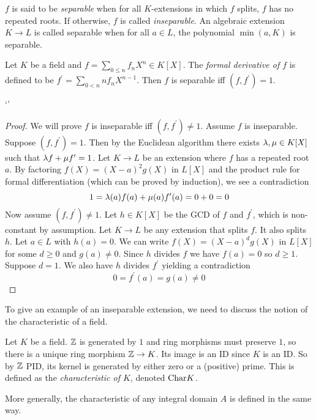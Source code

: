\documentclass{article}
\begin{document}
\begin{dfn} 

  $f$ is said to be \emph{separable} when 
  for all $K$-extensions in which $f$ splits, $f$ has no repeated roots. 
  If otherwise, $f$ is called \emph{inseparable}. 
  An algebraic extension $K \to L$ is called 
  separable when for all $a \in L$,
  the polynomial $\min(a , K)$ is separable.
\end{dfn}

\begin{prop}
  
  Let $K$ be a field and $f = \sum_{0 \leq n} f_n X^n \in K[X]$. 
  The \emph{formal derivative of $f$} is defined to be 
  $f^\prime = \sum_{0 < n} n f_n X^{n-1}$. 
  Then $f$ is separable iff $(f , f^\prime) = 1$.
\end{prop}`'
\begin{proof}
  We will prove $f$ is inseparable iff $(f , f^\prime) \neq 1$.
  Assume $f$ is inseparable.
  Suppose $(f , f^\prime) = 1$.
  Then by the Euclidean algorithm there exists
  $\lambda, \mu \in K[X]$ such that $\lambda f + \mu f^\prime = 1$.
  Let $K \to L$ be an extension where $f$ has a repeated root $a$.
  By factoring $f(X) = (X - a)^2 g(X)$ in $L[X]$ and the product rule
  for formal differentiation (which can be proved by induction),
  we see a contradiction \[
    1 = \lambda(a) f(a) + \mu(a) f^\prime(a) = 0 + 0 = 0
  \]
  Now assume $(f , f^\prime) \neq 1$.
  Let $h \in K[X]$ be the GCD of $f$ and $f^\prime$,
  which is non-constant by assumption.
  Let $K \to L$ be any extension that splits $f$.
  It also splits $h$.
  Let $a \in L$ with $h(a) = 0$.
  We can write $f(X) = (X - a)^d g(X)$ in $L[X]$ for some $d \geq 0$
  and $g(a) \neq 0$.
  Since $h$ divides $f$ we have $f(a) = 0$ so $d \geq 1$.
  Suppose $d = 1$.
  We also have $h$ divides $f^\prime$ yielding a contradiction \[
    0 = f^\prime(a) = g(a) \neq 0
  \]
\end{proof}

To give an example of an inseparable extension,
we need to discuss the notion of the characteristic of a field.

\begin{dfn}  
  
  Let $K$ be a field. 
  $\mathbb{Z}$ is generated by $1$ and ring morphisms must preserve $1$, 
  so there is a unique ring morphism $\mathbb{Z} \to K$.
  Its image is an ID since $K$ is an ID.
  So by $\mathbb{Z}$ PID, its kernel is generated by either zero or a (positive) prime. 
  This is defined as the \emph{characteristic of $K$},
  denoted $\mathrm{Char}K$.

  More generally, the characteristic of any integral domain $A$
  is defined in the same way.
\end{dfn}
\end{document}
